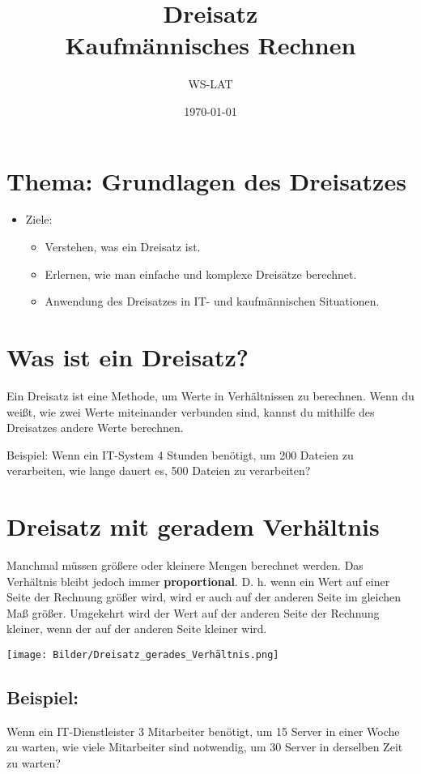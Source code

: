\documentclass{orgstandard}
\author{WS-LAT}
\date{\today}
\title{Dreisatz\\\medskip
\large Kaufmännisches Rechnen}
\begin{document}
\maketitle
\section{Thema: Grundlagen des Dreisatzes}
\label{sec:org91749f5}


\begin{itemize}
\item Ziele:
\begin{itemize}
\item Verstehen, was ein Dreisatz ist.
\item Erlernen, wie man einfache und komplexe Dreisätze berechnet.
\item Anwendung des Dreisatzes in IT- und kaufmännischen Situationen.
\end{itemize}
\end{itemize}
\section{Was ist ein Dreisatz?}
\label{sec:orgaff311f}

Ein Dreisatz ist eine Methode, um Werte in Verhältnissen zu berechnen. Wenn du weißt, wie zwei Werte miteinander verbunden sind, kannst du mithilfe des Dreisatzes andere Werte berechnen.

Beispiel: Wenn ein IT-System 4 Stunden benötigt, um 200 Dateien zu verarbeiten, wie lange dauert es, 500 Dateien zu verarbeiten?
\section{Dreisatz mit geradem Verhältnis}
\label{sec:org5a4356f}
Manchmal müssen größere oder kleinere Mengen berechnet werden. Das Verhältnis bleibt jedoch immer \textbf{proportional}. D. h. wenn ein Wert auf einer Seite der Rechnung größer wird, wird er auch auf der anderen Seite im gleichen Maß größer. Umgekehrt wird der Wert auf der anderen Seite der Rechnung kleiner, wenn der auf der anderen Seite kleiner wird.

\begin{center}
\texttt{[image: Bilder/Dreisatz\_gerades\_Verhältnis.png]}
\end{center}
\subsection{Beispiel:}
\label{sec:org3efca4a}
Wenn ein IT-Dienstleister 3 Mitarbeiter benötigt, um 15 Server in einer Woche zu warten, wie viele Mitarbeiter sind notwendig, um 30 Server in derselben Zeit zu warten?
\end{document}
